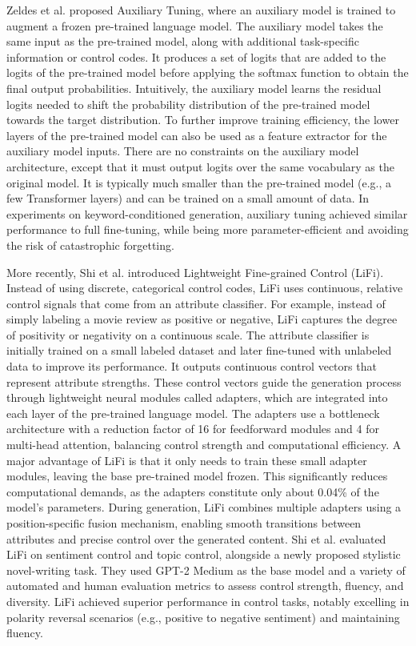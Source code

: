 Zeldes et al. \cite{zeldes2020technicalreportauxiliarytuning} proposed Auxiliary Tuning, where an auxiliary model is trained to augment a frozen pre-trained language model.
The auxiliary model takes the same input as the pre-trained model, along with additional task-specific information or control codes. It produces a set of logits that are added to the logits of the pre-trained model before applying the softmax function to obtain the final output probabilities.
Intuitively, the auxiliary model learns the residual logits needed to shift the probability distribution of the pre-trained model towards the target distribution.
To further improve training efficiency, the lower layers of the pre-trained model can also be used as a feature extractor for the auxiliary model inputs. 
There are no constraints on the auxiliary model architecture, except that it must output logits over the same vocabulary as the original model.
It is typically much smaller than the pre-trained model (e.g., a few Transformer layers) and can be trained on a small amount of data.
In experiments on keyword-conditioned generation, auxiliary tuning achieved similar performance to full fine-tuning, while being more parameter-efficient and avoiding the risk of catastrophic forgetting.

More recently, Shi et al. \cite{shi2024lifilightweightcontrolledtext} introduced Lightweight Fine-grained Control (LiFi). 
Instead of using discrete, categorical control codes, LiFi uses continuous, relative control signals that come from an attribute classifier. 
For example, instead of simply labeling a movie review as positive or negative, LiFi captures the degree of positivity or negativity on a continuous scale.
The attribute classifier is initially trained on a small labeled dataset and later fine-tuned with unlabeled data to improve its performance. 
It outputs continuous control vectors that represent attribute strengths. 
These control vectors guide the generation process through lightweight neural modules called adapters, which are integrated into each layer of the pre-trained language model. 
The adapters use a bottleneck architecture with a reduction factor of 16 for feedforward modules and 4 for multi-head attention, balancing control strength and computational efficiency.
A major advantage of LiFi is that it only needs to train these small adapter modules, leaving the base pre-trained model frozen. 
This significantly reduces computational demands, as the adapters constitute only about 0.04\% of the model's parameters. 
During generation, LiFi combines multiple adapters using a position-specific fusion mechanism, enabling smooth transitions between attributes and precise control over the generated content.
Shi et al. evaluated LiFi on sentiment control and topic control, alongside a newly proposed stylistic novel-writing task. 
They used GPT-2 Medium as the base model and a variety of automated and human evaluation metrics to assess control strength, fluency, and diversity. 
LiFi achieved superior performance in control tasks, notably excelling in polarity reversal scenarios (e.g., positive to negative sentiment) and maintaining fluency.

